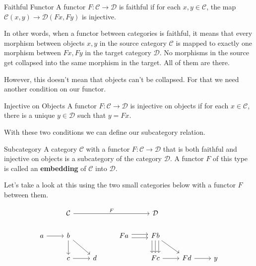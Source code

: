 \documentclass[12pt]{article}
\begin{document}
\begin{definition}{Faithful Functor}{}
    A functor $F:\mathcal{C}\rightarrow\mathcal{D}$ is faithful if for each $x,y\in\mathcal{C}$, the map $\mathcal{C}(x, y)\rightarrow\mathcal{D}(Fx,Fy)$ is injective.
\end{definition}
In other words, when a functor between categories is faithful, it means that every morphism between objects $x,y$ in the source category $\mathcal{C}$ is mapped to exactly one morphism between $Fx, Fy$ in the target category $\mathcal{D}$.
No morphisms in the source get collapsed into the same morphism in the target.
All of them are there.

However, this doesn't mean that objects can't be collapsed.
For that we need another condition on our functor.

\begin{definition}{Injective on Objects}{}
    A functor $F:\mathcal{C}\rightarrow\mathcal{D}$ is injective on objects if for each $x\in\mathcal{C}$, there is a unique $y\in\mathcal{D}$ such that $y=Fx$.
\end{definition}

With these two conditions we can define our subcategory relation.

\begin{definition}{Subcategory}{}
    A category $\mathcal{C}$ with a functor $F:\mathcal{C}\rightarrow\mathcal{D}$ that is both faithful and injective on objects is a subcategory of the category $\mathcal{D}$.
    A functor $F$ of this type is called an \textbf{embedding} of $\mathcal{C}$ into $\mathcal{D}$.
\end{definition}

Let's take a look at this using the two small categories below with a functor $F$ between them.

\[\begin{tikzcd}
        & {\mathcal{C}} &&& {\mathcal{D}} \\
        a & b && Fa & Fb \\
        & c & d && Fc & Fd & y
        \arrow["F", from=1-2, to=1-5]
        \arrow[from=2-1, to=2-2]
        \arrow[from=2-2, to=3-2]
        \arrow[from=2-2, to=3-3]
        \arrow[shift left, from=2-4, to=2-5]
        \arrow[shift right, from=2-4, to=2-5]
        \arrow[shift left=2, from=2-5, to=3-5]
        \arrow[shift right=2, from=2-5, to=3-5]
        \arrow[from=2-5, to=3-5]
        \arrow[from=2-5, to=3-6]
        \arrow[from=3-2, to=3-3]
        \arrow[from=3-5, to=3-6]
        \arrow[from=3-6, to=3-7]
    \end{tikzcd}\]
\end{document}
